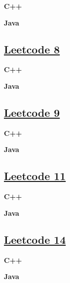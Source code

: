 \textbf{C++}\par


\textbf{Java}\par



\subsection{\href{https://leetcode-cn.com/}{Leetcode 8}}\label{app:codelist:leetcode:8}

\textbf{C++}\par


\textbf{Java}\par



\subsection{\href{https://leetcode-cn.com/}{Leetcode 9}}\label{app:codelist:leetcode:9}

\textbf{C++}\par


\textbf{Java}\par



\subsection{\href{https://leetcode-cn.com/}{Leetcode 11}}\label{app:codelist:leetcode:11}

\textbf{C++}\par


\textbf{Java}\par



\subsection{\href{https://leetcode-cn.com/}{Leetcode 14}}\label{app:codelist:leetcode:14}

\textbf{C++}\par


\textbf{Java}\par



